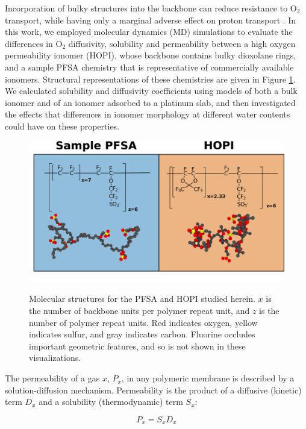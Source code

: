 \documentclass[journal=jacsat,manuscript=article]{achemso}
\begin{document}
Incorporation of bulky structures into the backbone can reduce resistance to O$_2$ transport, while having only a marginal adverse effect on proton transport \cite{katzenberg_highly_2020,jinnouchi_role_2021,pinnau_gas_1996,rolfi_new_2018}. In this work, we employed molecular dynamics (MD) simulations to evaluate the differences in O$_2$ diffusivity, solubility and permeability between a high oxygen permeability ionomer (HOPI), whose backbone contains bulky dioxolane rings, and a sample PFSA chemistry that is representative of commercially available ionomers. Structural representations of these chemistries are given in Figure \ref{fig:chemcomp}. We calculated solubility and diffusivity coefficients using models of both a bulk ionomer and of an ionomer adsorbed to a platinum slab, and then investigated the effects that differences in ionomer morphology at different water contents could have on these properties. 

\begin{figure}[h!]
  \includegraphics[width=.9\linewidth]{chemcomp.png}
  \label{fig:chemcomp}
  \centering
  \caption{Molecular structures for the PFSA and HOPI studied herein. $x$ is the number of backbone units per polymer repeat unit, and $z$ is the number of polymer repeat units. Red indicates oxygen, yellow indicates sulfur, and gray indicates carbon. Fluorine occludes important geometric features, and so is not shown in these visualizations.}
  \end{figure}

The permeability of a gas $x$, $P_x$, in any polymeric membrane is described by a solution-diffusion mechanism. Permeability is the product of a diffusive (kinetic) term $D_x$ and a solubility (thermodynamic) term $S_x$:

\begin{equation}
    \label{eqn:permeability}
    P_x = S_xD_x
\end{equation}
\end{document}
